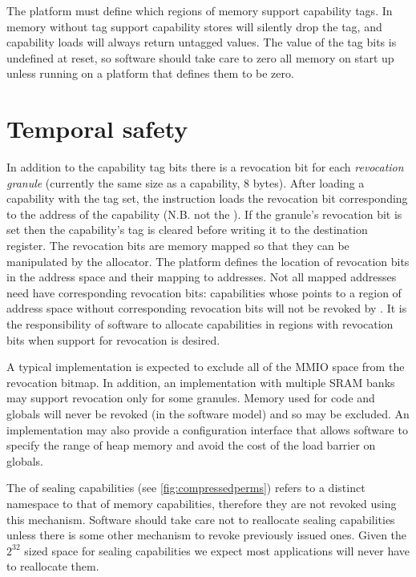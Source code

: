 The platform must define which regions of memory support capability tags.
In memory without tag support capability stores will silently drop the tag, and capability loads will always return untagged values.
The value of the tag bits is undefined at reset, so software should take care to zero all memory on start up unless running on a platform that defines them to be zero.

\section{Temporal safety}
\label{sec:temporal}

In addition to the capability tag bits there is a revocation bit for each \emph{revocation granule} (currently the same size as a capability, 8 bytes).
After loading a capability with the tag set, the  instruction loads the revocation bit corresponding to the \cbase{} address of the capability (N.B. not the \caddress{}).
If the granule's revocation bit is set then the capability's tag is cleared before writing it to the destination register.
The revocation bits are memory mapped so that they can be manipulated by the allocator.
The platform defines the location of revocation bits in the address space and their mapping to addresses.
Not all mapped addresses need have corresponding revocation bits:
capabilities whose \cbase{} points to a region of address space without corresponding revocation bits will not be revoked by .
It is the responsibility of software to allocate capabilities in regions with revocation bits when support for revocation is desired.

A typical implementation is expected to exclude all of the MMIO space from the revocation bitmap.
In addition, an implementation with multiple SRAM banks may support revocation only for some granules.
Memory used for code and globals will never be revoked (in the software model) and so may be excluded.
An implementation may also provide a configuration interface that allows software to specify the range of heap memory and avoid the cost of the load barrier on globals.

The \cbase{} of sealing capabilities (see \cref{fig:compressedperms}) refers to a distinct namespace to that of memory capabilities, therefore they are not revoked using this mechanism.
Software should take care not to reallocate sealing capabilities unless there is some other mechanism to revoke previously issued ones.
Given the $2^{32}$ sized space for sealing capabilities we expect most applications will never have to reallocate them.

